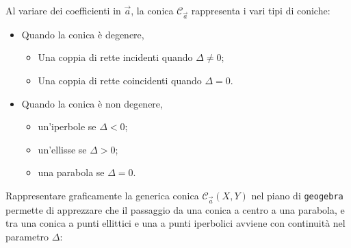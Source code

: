 \documentclass{amsart}
\begin{document}
Al variare dei coefficienti in $\vec a$, la conica $\mathcal C_{\vec a}$ rappresenta i vari tipi di coniche:
\begin{itemize}
  \item Quando la conica è degenere,
  \begin{itemize}
    \item Una coppia di rette incidenti quando $\Delta \neq 0$;
    \item Una coppia di rette coincidenti quando $\Delta = 0$.
  \end{itemize}   
  \item Quando la conica è non degenere,
  \begin{itemize}
    \item un'iperbole se $\Delta < 0$; 
    \item un'ellisse se $\Delta > 0$;
    \item una parabola se $\Delta = 0$.
  \end{itemize}
\end{itemize}
Rappresentare graficamente la generica conica $\mathcal C_{\vec a}(X,Y)$ nel piano di {\tt geogebra} permette di apprezzare che il passaggio da una conica a centro a una parabola, e tra una conica a punti ellittici e una a punti iperbolici avviene con continuità nel parametro $\Delta$:
\end{document}
